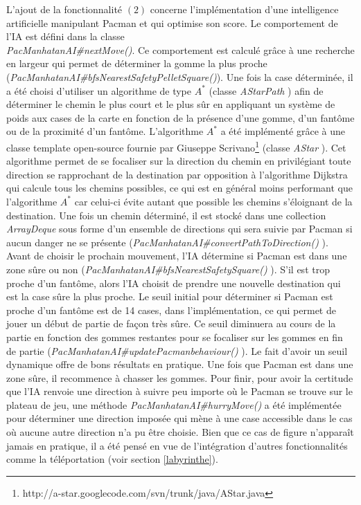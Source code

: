 \documentclass[12pt, openany]{report}
\begin{document}
L'ajout de la fonctionnalité $(2)$ concerne l'implémentation d'une intelligence artificielle manipulant Pacman et qui optimise son score. Le comportement de l'IA est défini dans la classe\\
 \mbox{\textit{PacManhatanAI\#nextMove()}}. Ce comportement est calculé grâce à une recherche en largeur qui permet de déterminer la gomme la plus proche (\mbox{\textit{PacManhatanAI\#bfsNearestSafetyPelletSquare()}}). Une fois la case déterminée, il a été choisi d'utiliser un algorithme de type $A^*$ (classe \mbox{\textit{AStarPath}}
) afin de déterminer le chemin le plus court et le plus sûr en appliquant un système de poids aux cases de la carte en fonction de la présence d'une gomme, d'un fantôme ou de la proximité d'un fantôme. L'algorithme $A^*$ a été implémenté grâce à une classe template open-source fournie par Giuseppe Scrivano\footnote{http://a-star.googlecode.com/svn/trunk/java/AStar.java}
(classe \mbox{\textit{AStar}}
). Cet algorithme permet de se focaliser sur la direction du chemin en privilégiant toute direction se rapprochant de la destination par opposition à l'algorithme Dijkstra qui calcule tous les chemins possibles, ce qui est en général moins performant que l'algorithme $A^*$ car celui-ci évite autant que possible les chemins s'éloignant de la destination. Une fois un chemin déterminé, il est stocké dans une collection \textit{ArrayDeque} sous forme d'un ensemble de directions qui sera suivie par Pacman si aucun danger ne se présente (\mbox{\textit{PacManhatanAI\#convertPathToDirection()}}
). Avant de choisir le prochain mouvement, l'IA détermine si Pacman est dans une zone sûre ou non (\mbox{\textit{PacManhatanAI\#bfsNearestSafetySquare()}}
). S'il est trop proche d'un fantôme, alors l'IA choisit de prendre une nouvelle destination qui est la case sûre la plus proche. Le seuil initial pour déterminer si Pacman est proche d'un fantôme est de 14 cases, dans l'implémentation, ce qui permet de jouer un début de partie de façon très sûre. Ce seuil diminuera au cours de la partie en fonction des gommes restantes pour se focaliser sur les gommes en fin de partie (\mbox{\textit{PacManhatanAI\#updatePacmanbehaviour()}}
). Le fait d'avoir un seuil dynamique offre de bons résultats en pratique. Une fois que Pacman est dans une zone sûre, il recommence à chasser les gommes. Pour finir, pour avoir la certitude que l'IA renvoie une direction à suivre peu importe où le Pacman se trouve sur le plateau de jeu, une méthode \mbox{\textit{PacManhatanAI\#hurryMove()}}
a été implémentée pour déterminer une direction imposée qui mène à une case accessible dans le cas où aucune autre direction n'a pu être choisie. Bien que ce cas de figure n'apparaît jamais en pratique, il a été pensé en vue de l'intégration d'autres fonctionnalités comme la téléportation (voir section \ref{labyrinthe}).
\end{document}
